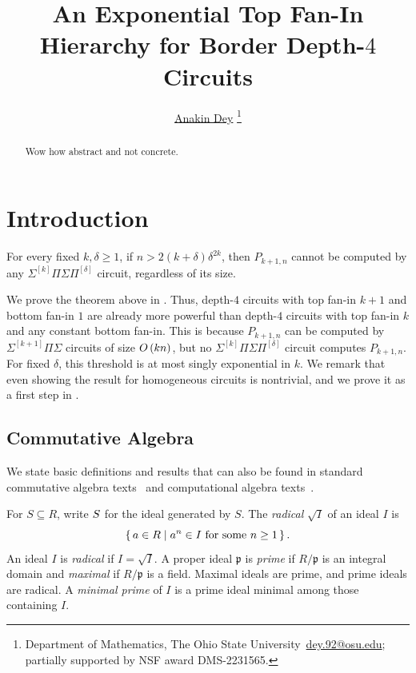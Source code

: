 \documentclass[11pt,letterpaper,dvipsnames]{article}
\title{An Exponential Top Fan-In Hierarchy for Border Depth-\texorpdfstring{$4$}{4} Circuits}
\author{
    \href{https://anakin.phd/}{Anakin Dey} \thanks{Department of Mathematics, The Ohio State University~\href{mailto:dey.92@osu.edu}
    {{\ttfamily\upshape dey.92@osu.edu}}; partially supported by NSF award DMS-2231565.} \and 
}
\newif\ifmynotes
\newcommand{\ADnote}[1]{\ifmynotes\textcolor{orange}{[Anakin: #1]}\else\fi}
\begin{document}
\date{}
\maketitle

\begin{abstract}
  Wow how abstract and not concrete.
\end{abstract}


\newpage 
\tableofcontents

\section{Introduction}\label{sec:intro}

\begin{thrm}\label{thrm:intro-exact}
    For every fixed $k, \delta \geq 1$, if $n > 2(k + \delta)\delta^{2k}$, then $P_{k + 1, n}$ cannot be computed by any $\Sigma^{[k]}\Pi\Sigma\Pi^{[\delta]}$ circuit, regardless of its size.
\end{thrm}
We prove the theorem above in .
Thus, depth-$4$ circuits with top fan-in $k + 1$ and bottom fan-in $1$ are already more powerful than depth-$4$ circuits with top fan-in $k$ and any constant bottom fan-in. 
This is because $P_{k + 1, n}$ can be computed by $\Sigma^{[k+1]}\Pi\Sigma$ circuits of size $O\kern-0.0pt\left(kn\right)$, but no $\Sigma^{[k]}\Pi\Sigma\Pi^{[\delta]}$ circuit computes $P_{k + 1, n}$. 
For fixed $\delta$, this threshold is at most singly exponential in $k$.
We remark that even showing the result for homogeneous circuits is nontrivial, and we prove it as a first step in .


\subsection{Commutative Algebra}\label{sec:prelim-ca}

We state basic definitions and results that can also be found in standard commutative algebra texts~\cite{Eis95, AM69, Mat86, Lan02} and computational algebra texts~\cite{vzGG13, CLO25}.

For $S \subseteq R$, write $\ideal{S}$ for the ideal generated by $S$. 
The \emph{radical} $\sqrt{I}$ of an ideal $I$ is 
\[
    \set{a \in R | a^n \in I \text{ for some } n \geq 1}.
\]
An ideal $I$ is \emph{radical} if $I = \sqrt{I}$.
A proper ideal $\mathfrak{p}$ is \emph{prime} if $R/\mathfrak{p}$ is an integral domain and \emph{maximal} if $R/\mathfrak{p}$ is a field.
Maximal ideals are prime, and prime ideals are radical.
A \emph{minimal prime} of $I$ is a prime ideal minimal among those containing $I$.
\end{document}
